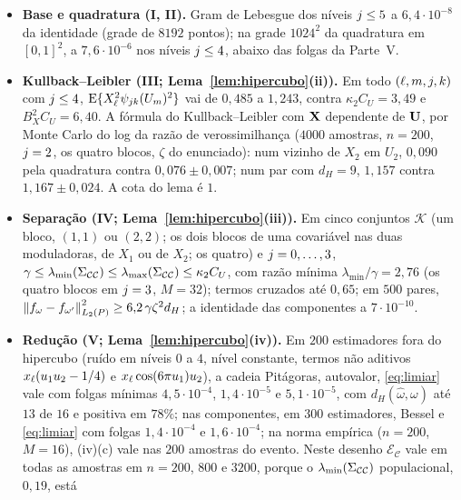 \documentclass[11pt,a4paper]{article}
\newcommand{\lmin}{\lambda_{\min}}
\newcommand{\lmaxx}{\lambda_{\max}}
\newcommand{\Kcal}{\mathcal{K}}
\newcommand{\Ccal}{\mathcal{C}}
\newcommand{\dH}{d_{H}}
\newcommand{\ECc}{\mathcal{E}_{\mathcal{C}}}
\begin{document}
\begin{itemize}[nosep, leftmargin=*]
  \item \textbf{Base e quadratura (I, II).} Gram de Lebesgue dos níveis
    $j \le 5$ a $6{,}4\cdot10^{-8}$ da identidade (grade de $8192$
    pontos); na grade $1024^{2}$ da quadratura em $[0,1]^{2}$, a
    $7{,}6\cdot10^{-6}$ nos níveis $j \le 4$, abaixo das folgas da Parte~V.
  \item \textbf{Kullback--Leibler (III; Lema~\ref{lem:hipercubo}(ii)).} Em todo
    $(\ell,m,j,k)$ com $j \le 4$, $\mathrm{E}\{X_{\ell}^{2}
    \psi_{jk}(U_{m})^{2}\}$ vai de $0{,}485$ a $1{,}243$, contra
    $\kappa_{2}C_{U} = 3{,}49$ e $B_{X}^{2}C_{U} = 6{,}40$. A fórmula do
    Kullback--Leibler com $\mathbf{X}$ dependente de $\mathbf{U}$, por Monte Carlo do log da
    razão de verossimilhança ($4000$ amostras, $n = 200$, $j = 2$, os quatro
    blocos, $\zeta$ do enunciado): num vizinho de $X_{2}$ em $U_{2}$,
    $0{,}090$ pela quadratura contra $0{,}076 \pm 0{,}007$; num par com
    $\dH = 9$, $1{,}157$ contra $1{,}167 \pm 0{,}024$. A cota do lema é $1$.
  \item \textbf{Separação (IV; Lema~\ref{lem:hipercubo}(iii)).} Em cinco
    conjuntos $\Kcal$ (um bloco, $(1,1)$ ou $(2,2)$; os dois blocos de uma
    covariável nas duas moduladoras, de $X_{1}$ ou de $X_{2}$; os quatro) e
    $j = 0,\dots,3$,
    $\gamma \le \lmin(\Gram_{\Ccal\Ccal}) \le \lmaxx(\Gram_{\Ccal\Ccal}) \le
    \kappa_{2}C_{U}$, com razão mínima $\lmin/\gamma = 2{,}76$ (os quatro
    blocos em $j = 3$, $M = 32$); termos cruzados até $0{,}65$; em $500$
    pares, $\normL{f_{\omega} - f_{\omega'}}^{2} \ge 6{,}2\,\gamma\zeta^{2}\dH$;
    a identidade das componentes a $7\cdot10^{-10}$.
  \item \textbf{Redução (V; Lema~\ref{lem:hipercubo}(iv)).} Em $200$
    estimadores fora do hipercubo (ruído em níveis $0$ a $4$, nível constante,
    termos não aditivos $x_{\ell}(u_{1}u_{2} - 1/4)$ e $x_{\ell}\cos(6\pi
    u_{1})u_{2}$), a cadeia Pitágoras, autovalor, \eqref{eq:limiar} vale com
    folgas mínimas $4{,}5\cdot10^{-4}$, $1{,}4\cdot10^{-5}$ e
    $5{,}1\cdot10^{-5}$, com $\dH(\widehat\omega,\omega)$ até $13$ de $16$ e
    positiva em $78\%$; nas componentes, em $300$ estimadores, Bessel e
    \eqref{eq:limiar} com folgas $1{,}4\cdot10^{-4}$ e $1{,}6\cdot10^{-4}$; na
    norma empírica ($n = 200$, $M = 16$), (iv)(c) vale nas $200$ amostras do
    evento. Neste desenho $\ECc$ vale em todas as amostras em $n = 200$, $800$
    e $3200$, porque o $\lmin(\Gram_{\Ccal\Ccal})$ populacional, $0{,}19$, está

\end{itemize}
\end{document}
